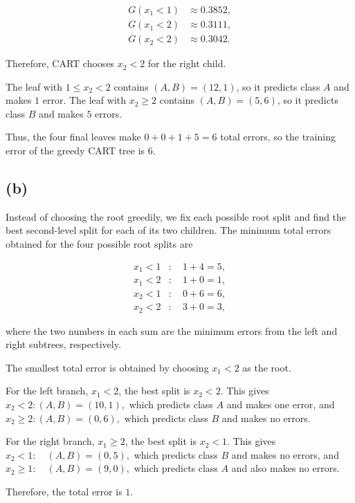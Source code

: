 \documentclass{article}
\begin{document}
$$
\begin{aligned}
G(x_1<1) &\approx 0.3852,\\
G(x_1<2) &\approx 0.3111,\\
G(x_2<2) &\approx 0.3042.
\end{aligned}
$$

Therefore, CART chooses
$
\boxed{x_2<2}
$ for the right child.

The leaf with $1\leq x_2<2$ contains $(A,B)=(12,1)$, so it predicts class $A$ and makes $1$ error. The leaf with $x_2\geq2$ contains $(A,B)=(5,6)$, so it predicts class $B$ and makes $5$ errors.

Thus, the four final leaves make $
0+0+1+5=6
$ total errors, so the training error of the greedy CART tree is
$
\boxed{6}.
$


\vspace{5mm}

\subsection*{(b)}

Instead of choosing the root greedily, we fix each possible root split and find the best second-level split for each of its two children. The minimum total errors obtained for the four possible root splits are

$$
\begin{aligned}
x_1<1 &: \quad 1+4=5,\\
x_1<2 &: \quad 1+0=1,\\
x_2<1 &: \quad 0+6=6,\\
x_2<2 &: \quad 3+0=3,
\end{aligned}
$$

where the two numbers in each sum are the minimum errors from the left and right subtrees, respectively.

The smallest total error is obtained by choosing $
\boxed{x_1<2}
$ as the root.

For the left branch, $x_1<2$, the best split is $x_2<2$. This gives $
x_2<2: (A,B)=(10,1),
$ which predicts class $A$ and makes one error, and $
x_2\geq2: (A,B)=(0,6),
$ which predicts class $B$ and makes no errors.

For the right branch, $x_1\geq2$, the best split is $x_2<1$. This gives $
x_2<1:\quad (A,B)=(0,5),
$ which predicts class $B$ and makes no errors, and $
x_2\geq1:\quad (A,B)=(9,0),
$ which predicts class $A$ and also makes no errors.

Therefore, the total error is $
\boxed{1}.
$ 
\end{document}
